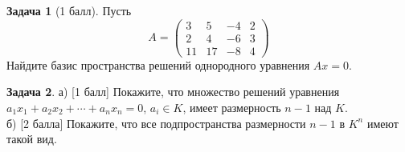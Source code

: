 \documentclass[12pt, fleqn]{extarticle}
\theoremstyle{definition}
\newtheorem{problem}{Задача}
\theoremstyle{remark}
\begin{document}
\begin{problem}[1 балл]
Пусть 
$$A=\left(\begin{matrix}
3& 5&-4& 2 \\
2& 4&-6& 3 \\
11& 17& -8& 4 
\end{matrix}\right)$$
Найдите базис пространства решений однородного уравнения $Ax = 0$.
\end{problem}

\begin{problem}
а) [1 балл] Покажите, что множество решений уравнения $a_1x_1+a_2x_2+\cdots+a_nx_n=0$, 
$a_{i} \in K$, имеет размерность $n-1$ над $K$. \\
б) [2 балла] Покажите, что все подпространства размерности $n-1$ в $K^n$ имеют такой вид.
\end{problem}
\end{document}
